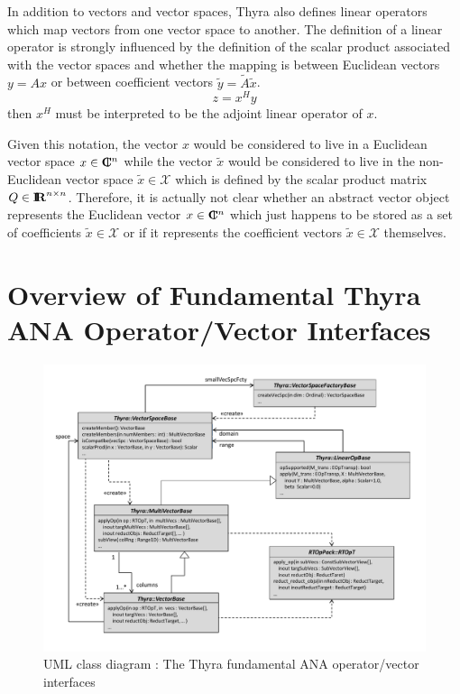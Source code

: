 \documentclass[11pt]{SANDreport}
\begin{document}
In addition to vectors and vector spaces, Thyra also defines linear operators which map vectors from one vector space to another.  The definition of a linear operator is strongly influenced by the definition of the scalar product associated with the vector spaces and whether the mapping is between Euclidean vectors $y = A x$ or between coefficient vectors $\tilde{y} = \tilde{A} \tilde{x}$. %
%
\begin{equation}
z = x^H y
\end{equation}
%
then $x^H$ must be interpreted to be the adjoint linear operator of $x$.

Given this notation, the vector $x$ would be considered to live in a Euclidean vector space $x\in\mbox{\textbf{C}}\hspace{-1.1ex}\mbox{l}\hspace{0.4ex}^n$ while the vector $\tilde{x}$ would be considered to live in the non-Euclidean vector space $\tilde{x}\in\mathcal{X}$ which is defined by the scalar product matrix $Q\in\mbox{\textbf{I}}\hspace{-0.6ex}\mbox{\textbf{R}}^{n\times{}n}$.  Therefore, it is actually not clear whether an abstract vector object represents the Euclidean vector $x\in\mbox{\textbf{C}}\hspace{-1.1ex}\mbox{l}\hspace{0.4ex}^n$ which just happens to be stored as a set of coefficients $\tilde{x}\in\mathcal{X}$ or if it represents the coefficient vectors $\tilde{x}\in\mathcal{X}$ themselves.


%
\section{Overview of Fundamental Thyra ANA Operator/Vector Interfaces}
\label{thyra:sec:Thyra_core_overview}
%

{\bsinglespace
\begin{figure}[p]
\begin{center}
\includegraphics*[scale=0.65]{ThyraANAOpVecInterfaces}
\end{center}
\caption{
\label{thyra:fig:basic_op_vec_itfc}
UML class diagram : The Thyra fundamental ANA operator/vector interfaces }
\end{figure}
\esinglespace}
\end{document}
